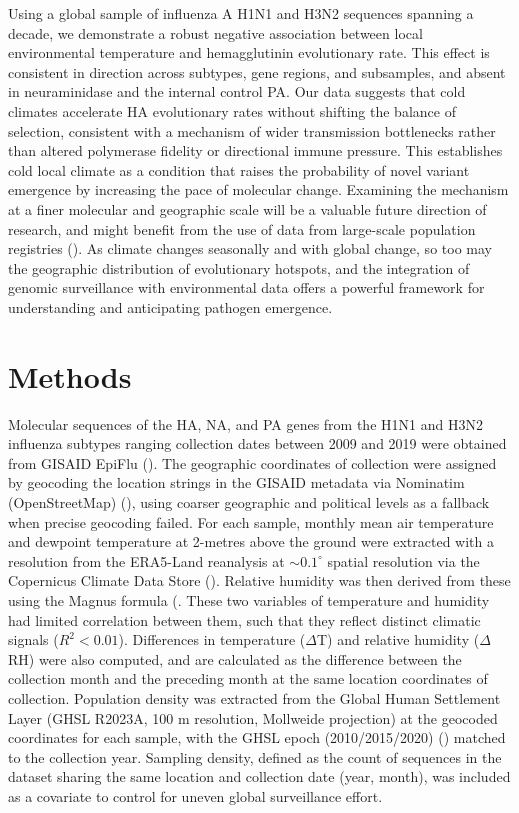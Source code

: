 \documentclass[11pt, a4paper]{article}
\begin{document}
Using a global sample of influenza A H1N1 and H3N2 sequences spanning a decade, we demonstrate a robust negative association between local environmental temperature and hemagglutinin evolutionary rate. This effect is consistent in direction across subtypes, gene regions, and subsamples, and absent in neuraminidase and the internal control PA. Our data suggests that cold climates accelerate HA evolutionary rates without shifting the balance of selection, consistent with a mechanism of wider transmission bottlenecks rather than altered polymerase fidelity or directional immune pressure. This establishes cold local climate as a condition that raises the probability of novel variant emergence by increasing the pace of molecular change. Examining the mechanism at a finer molecular and geographic scale will be a valuable future direction of research, and might benefit from the use of data from large-scale population registries (\cite{khurana_high-resolution_2024}). As climate changes seasonally and with global change, so too may the geographic distribution of evolutionary hotspots, and the integration of genomic surveillance with environmental data offers a powerful framework for understanding and anticipating pathogen emergence.


\section*{Methods}

Molecular sequences of the HA, NA, and PA genes from the H1N1 and H3N2 influenza subtypes ranging collection dates between 2009 and 2019 were obtained from GISAID EpiFlu (\cite{shu_gisaid_2017}). The geographic coordinates of collection were assigned by geocoding the location strings in the GISAID metadata via Nominatim (OpenStreetMap) (\cite{noauthor_architecture_nodate, noauthor_openstreetmap_nodate}), using coarser geographic and political levels as a fallback when precise geocoding failed. For each sample, monthly mean air temperature and dewpoint temperature at 2-metres above the ground were extracted with a resolution from the ERA5-Land reanalysis at ${\sim}0.1^\circ$ spatial resolution via the Copernicus Climate Data Store (\cite{noauthor_era5_nodate}). Relative humidity was then derived from these using the Magnus formula (\cite{alduchov_improved_1996}. These two variables of temperature and humidity had limited correlation between them, such that they reflect distinct climatic signals ($R^2 < 0.01$). Differences in temperature ($\Delta$T) and relative humidity ($\Delta$RH) were also computed, and are calculated as the difference between the collection month and the preceding month at the same location coordinates of collection. Population density was extracted from the Global Human Settlement Layer (GHSL R2023A, 100 m resolution, Mollweide projection) at the geocoded coordinates for each sample, with the GHSL epoch (2010/2015/2020) (\cite{pesaresi_advances_2024}) matched to the collection year. Sampling density, defined as the count of sequences in the dataset sharing the same location and collection date (year, month), was included as a covariate to control for uneven global surveillance effort.
\end{document}
